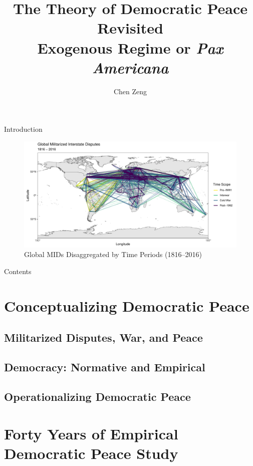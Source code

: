 \documentclass{beamer}
\title[Democratic Peace Revisited]{The Theory of Democratic Peace Revisited \\ \large{Exogenous Regime or \textit{Pax Americana}}}
\author{Chen Zeng}
\institute[]{Department of Political Science \\ Renmin University of China}
\begin{document}
	\maketitle

	\begin{frame}{Introduction}
		\begin{figure}
			\includegraphics[width=\linewidth]{data/output/plots/all.pdf}
			\caption{Global MIDs Disaggregated by Time Periods (1816--2016)}
		\end{figure}
	\end{frame}
	
	\begin{frame}{Contents}
		\tableofcontents
	\end{frame}

	\section{Conceptualizing Democratic Peace}
	
	\subsection{Militarized Disputes, War, and Peace}
	
	\subsection{Democracy: Normative and Empirical}
	
	\subsection{Operationalizing Democratic Peace}

	\section{Forty Years of Empirical Democratic Peace Study}
	
\end{document}
